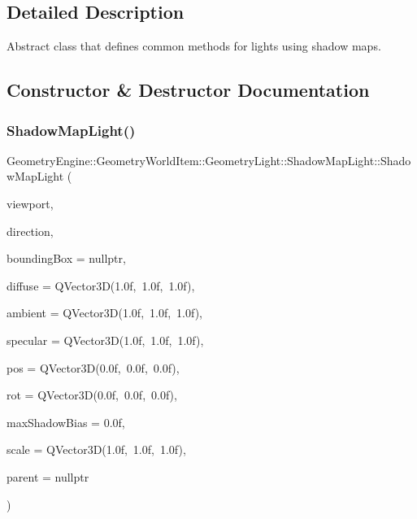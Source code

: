 \subsection{Detailed Description}
Abstract class that defines common methods for lights using shadow maps. 

\subsection{Constructor \& Destructor Documentation}
\mbox{\label{class_geometry_engine_1_1_geometry_world_item_1_1_geometry_light_1_1_shadow_map_light_a3289b4d430e9c738be137a38084d1906}} 
\subsubsection{\texorpdfstring{ShadowMapLight()}{ShadowMapLight()}\hspace{0.1cm}{\footnotesize\ttfamily [1/2]}}
{\footnotesize\ttfamily Geometry\+Engine\+::\+Geometry\+World\+Item\+::\+Geometry\+Light\+::\+Shadow\+Map\+Light\+::\+Shadow\+Map\+Light (\begin{DoxyParamCaption}\item[{const \mbox{\hyperlink{class_geometry_engine_1_1_geometry_item_utils_1_1_viewport}{Geometry\+Item\+Utils\+::\+Viewport}} \&}]{viewport,  }\item[{const Q\+Vector3D \&}]{direction,  }\item[{\mbox{\hyperlink{class_geometry_engine_1_1_geometry_world_item_1_1_geometry_item_1_1_geometry_item}{Geometry\+Item\+::\+Geometry\+Item}} $\ast$}]{bounding\+Box = {\ttfamily nullptr},  }\item[{const Q\+Vector3D \&}]{diffuse = {\ttfamily QVector3D(1.0f,~1.0f,~1.0f)},  }\item[{const Q\+Vector3D \&}]{ambient = {\ttfamily QVector3D(1.0f,~1.0f,~1.0f)},  }\item[{const Q\+Vector3D \&}]{specular = {\ttfamily QVector3D(1.0f,~1.0f,~1.0f)},  }\item[{const Q\+Vector3D \&}]{pos = {\ttfamily QVector3D(0.0f,~0.0f,~0.0f)},  }\item[{const Q\+Vector3D \&}]{rot = {\ttfamily QVector3D(0.0f,~0.0f,~0.0f)},  }\item[{float}]{max\+Shadow\+Bias = {\ttfamily 0.0f},  }\item[{const Q\+Vector3D \&}]{scale = {\ttfamily QVector3D(1.0f,~1.0f,~1.0f)},  }\item[{\mbox{\hyperlink{class_geometry_engine_1_1_geometry_world_item_1_1_world_item}{World\+Item}} $\ast$}]{parent = {\ttfamily nullptr} }\end{DoxyParamCaption})}

